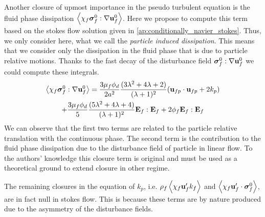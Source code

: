 Another closure of upmost importance in the pseudo turbulent equation is the fluid phase dissipation $\left<\chi_f \bm\sigma_f^0 :\mathbf{\nabla}\textbf{u}_f^0\right>$. 
Here we propose to compute this term based on the stokes flow solution given in \ref{ap:conditionally_navier_stokes}. 
Thus, we only consider here, what we call the \textit{particle induced dissipation}.
This means that we consider only the dissipation in the fluid phase that is due to particle relative motions. 
Thanks to the fast decay of the disturbance field $\bm\sigma_f^0 :\mathbf{\nabla}\textbf{u}_f^0$ we could compute these integrals. 
\begin{multline}
    \left<\chi_f \bm\sigma_f^0 :\mathbf{\nabla}\textbf{u}_f^0\right>
    =
    \frac{3\mu_f \phi_d}{2a^2}
    \frac{(3\lambda^2 + 4\lambda +2)}{(\lambda + 1)^2}
    (\textbf{u}_{fp}\cdot \textbf{u}_{fp} + 2 k_p ) \\
    + 
    \frac{3\mu_f \phi_d}{5}
    \frac{(5\lambda^2 + 4\lambda +4)}{(\lambda + 1)^2}
    \textbf{E}_f:\textbf{E}_f
    +2 \phi_f \textbf{E}_f:\textbf{E}_f
\end{multline}
We can observe that the first two terms are related to the particle relative translation with the continuous phase. 
The second term is the contribution to the fluid phase dissipation due to the  disturbance field of particle in linear flow. 
To the authors' knowledge this closure term is original and must be used as a theoretical ground to extend closure in other regime. 

The remaining closures in the equation of $k_p$, i.e. $\rho_f \left<\chi_f \textbf{u}_f' k_f\right>$ and $\left<\chi_f \textbf{u}_f' \cdot \bm{\sigma}_f^0\right>$, are in fact null in stokes flow. 
This is because these terms are by nature produced due to the asymmetry of the disturbance fields. 


